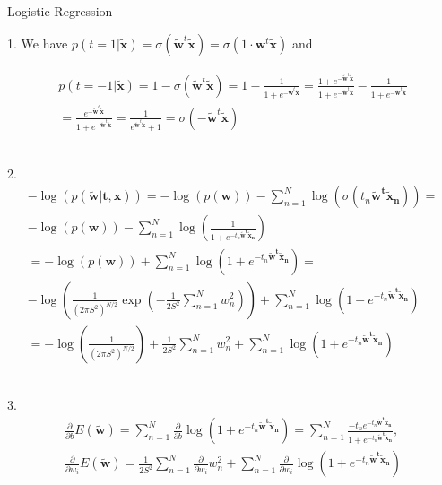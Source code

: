 \documentclass[english]{exercisesheet}
\author{Lorenzo Minecci, Daniel Strenger}
\begin{document}
 \makedocumentheader
 
 \begin{nexercise}{Logistic Regression}
\end{nexercise}

\begin{solution}
 1. We have $p(t=1|\bm{\tilde{x}})=\sigma(\bm{\tilde{w}}^t\bm{\tilde{x}})=\sigma(1\cdot\bm{w}^t\bm{\tilde{x}})$ and

 \begin{align*}
 p(t=-1|\bm{\tilde{x}})=1-\sigma(\bm{\tilde{w}}^t\bm{\tilde{x}})=1-\frac{1}{1+e^{-\bm{\tilde{w}}^t\bm{\tilde{x}}}}=\frac{1+e^{-\bm{\tilde{w}}^t\bm{\tilde{x}}}}{1+e^{-\bm{\tilde{w}}^t\bm{\tilde{x}}}}-\frac{1}{1+e^{-\bm{\tilde{w}}^t\bm{\tilde{x}}}}\\=\frac{e^{-\bm{\tilde{w}}^t\bm{\tilde{x}}}}{1+e^{-\bm{\tilde{w}}^t\bm{\tilde{x}}}}=\frac{1}{e^{\bm{\tilde{w}}^t\bm{\tilde{x}}}+1}=\sigma(-\bm{\tilde{w}}^t\bm{\tilde{x}})
\end{align*}\\
\par 2.
\begin{align*}
 -\log (p(\bm{\tilde{w}}|\bm{t},\bm{x}))=-\log(p(\bm{w}))-\sum_{n=1}^N \log(\sigma(t_n\bm{\tilde{w}^t\tilde{x}_n}))=\\-\log(p(\bm{w}))-\sum_{n=1}^N \log(\frac{1}{1+e^{-t_n\bm{\tilde{w}^t\tilde{x}_n}}})\\
 =-\log(p(\bm{w}))+\sum_{n=1}^N \log(1+e^{-t_n\bm{\tilde{w}^t\tilde{x}_n}})=\\-\log\left(\frac{1}{(2\pi S^{2})^{N/2}}\exp\left(-\frac{1}{2S^{2}}\sum_{n=1}^N w_n^2\right)\right)+\sum_{n=1}^N \log(1+e^{-t_n\bm{\tilde{w}^t\tilde{x}_n}})\\
 =-\log\left(\frac{1}{(2\pi S^{2})^{N/2}}\right)+\frac{1}{2S^{2}}\sum_{n=1}^N w_n^2+\sum_{n=1}^N \log(1+e^{-t_n\bm{\tilde{w}^t\tilde{x}_n}})
\end{align*}\\
\par 3.
\begin{align*}
 \frac{\partial}{\partial b}E(\bm{\tilde{w}})=\sum_{n=1}^N\frac{\partial}{\partial b} \log(1+e^{-t_n\bm{\tilde{w}^t\tilde{x}_n}})=\sum_{n=1}^N\frac{-t_ne^{-t_n\bm{\tilde{w}^t\tilde{x}_n}}}{1+e^{-t_n\bm{\tilde{w}^t\tilde{x}_n}}},\\
 \frac{\partial}{\partial w_i}E(\bm{\tilde{w}})=\frac{1}{2S^{2}}\sum_{n=1}^N  \frac{\partial}{\partial w_i} w_n^2+\sum_{n=1}^N\frac{\partial}{\partial w_i} \log(1+e^{-t_n\bm{\tilde{w}^t\tilde{x}_n}})\\

\end{align*}
\end{solution}
\end{document}
